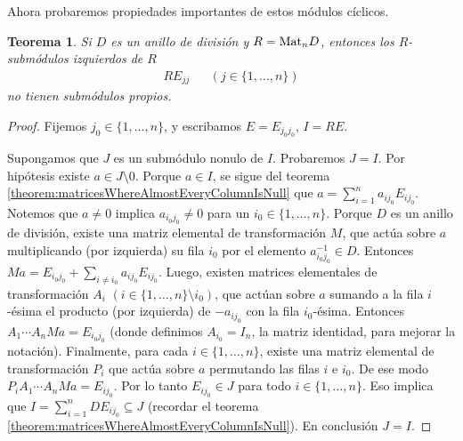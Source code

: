 \documentclass{report}
\newcommand{\Mat}{\textnormal{Mat}}
\newtheorem{theorem}{Teorema}
\begin{document}
  Ahora probaremos propiedades importantes de estos módulos cíclicos.

  \begin{theorem}
    Si \(D\) es un anillo de división y \(R = \Mat_n D\),
    entonces los \(R\)-submódulos izquierdos de \(R\)
    \begin{align}
      R E_{j j}
      &&(j \in \{1, \dots, n\})
    \end{align}
    no tienen submódulos propios.
  \end{theorem}
  \begin{proof}
    Fijemos \(j_0 \in \{1, \dots, n\}\), y escribamos \(E = E_{j_0 j_0}\), \(I = R E\).

    Supongamos que \(J\) es un submódulo nonulo de \(I\).
    Probaremos \(J = I\).
    Por hipótesis existe \(a \in J \setminus 0\).
    Porque \(a \in I\), se sigue del teorema \ref{theorem:matricesWhereAlmostEveryColumnIsNull} que \(a = \sum_{i = 1}^n a_{i j_0} E_{i j_0}\).
    Notemos que \(a \neq 0\) implica \(a_{i_0 j_0} \neq 0\) para un \(i_0 \in \{1, \dots, n\}\).
    Porque \(D\) es un anillo de división, existe una matriz elemental de transformación \(M\), que actúa sobre \(a\) multiplicando (por izquierda) su fila \(i_0\) por el elemento \(a_{i_0 j_0}^{- 1} \in D\).
    Entonces \(M a = E_{i_0 j_0} + \sum_{i \neq i_0} a_{i j_0} E_{i j_0}\).
    Luego, existen matrices elementales de transformación \(A_i\) \((i \in \{1, \dots, n\} \setminus i_0)\), que actúan sobre \(a\) sumando a la fila \(i\)-ésima el producto (por izquierda) de \(- a_{i j_0}\) con la fila \(i_0\)-ésima.
    Entonces \(A_1 \cdots A_n M a = E_{i_0 j_0}\) (donde definimos \(A_{i_0} = I_n\), la matriz identidad, para mejorar la notación).
    Finalmente, para cada \(i \in \{1, \dots, n\}\), existe una matriz elemental de transformación \(P_i\) que actúa sobre \(a\) permutando las filas \(i\) e \(i_0\).
    De ese modo \(P_i A_1 \cdots A_n M a = E_{i j_0}\).
    Por lo tanto \(E_{i j_0} \in J\) para todo \(i \in \{1, \dots, n\}\).
    Eso implica que \(I = \sum_{i = 1}^n D E_{i j_0} \subseteq J\) (recordar el teorema \ref{theorem:matricesWhereAlmostEveryColumnIsNull}).
    En conclusión \(J = I\).
  \end{proof}
\end{document}
